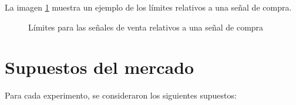 \documentclass[12pt]{scrbook}
\theoremstyle{break}
\theoremstyle{break}
\begin{document}
La imagen \ref{imagen:bandas horizontales} muestra un ejemplo de los límites relativos a una señal de compra.

\begin{figure}[htbp]
\centering
{}
\caption{\label{imagen:bandas horizontales} Límites para las señales de venta relativos a una señal de compra}
\end{figure}

\section{Supuestos del mercado}
\label{sec:supuestos del mercado}
Para cada experimento, se consideraron los siguientes supuestos:
\end{document}
